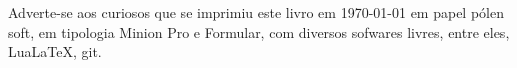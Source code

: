 \pagebreak

\ifodd\thepage\blankpage\fi

\mbox{}\vfill


\begin{center}
		\begin{minipage}{.7\textwidth}\tiny\noindent{}
		\centering\tiny
		Adverte-se aos curiosos que se imprimiu este 
		livro
		em \today{} em papel pólen soft, em tipologia Minion Pro e Formular, 
		com diversos sofwares livres, 
		entre eles, Lua\LaTeX, git.\\ 
		\medskip\\\
		\end{minipage}
\end{center}
